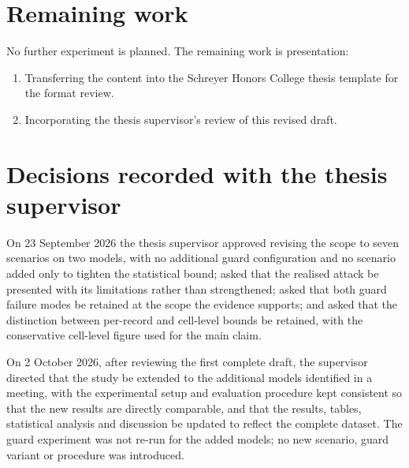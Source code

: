 \documentclass[11pt,oneside]{report}
\begin{document}
\section{Remaining work}

No further experiment is planned. The remaining work is presentation:
\begin{enumerate}
  \item Transferring the content into the Schreyer Honors College thesis
    template for the format review.
  \item Incorporating the thesis supervisor's review of this revised draft.
\end{enumerate}

\section{Decisions recorded with the thesis supervisor}

On 23 September 2026 the thesis supervisor approved revising the scope to seven
scenarios on two models, with no additional guard configuration and no scenario
added only to tighten the statistical bound; asked that the realised attack be
presented with its limitations rather than strengthened; asked that both guard
failure modes be retained at the scope the evidence supports; and asked that the
distinction between per-record and cell-level bounds be retained, with the
conservative cell-level figure used for the main claim.

On 2 October 2026, after reviewing the first complete draft, the supervisor
directed that the study be extended to the additional models identified in a
meeting, with the experimental setup and evaluation procedure kept consistent so
that the new results are directly comparable, and that the results, tables,
statistical analysis and discussion be updated to reflect the complete dataset.
The guard experiment was not re-run for the added models; no new scenario,
guard variant or procedure was introduced.
\end{document}
